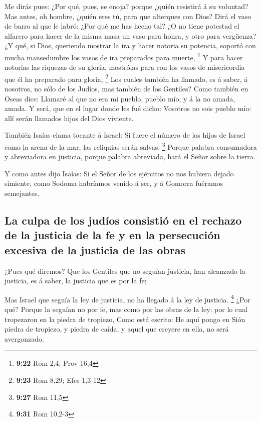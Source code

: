  Me dirás pues: ¿Por qué, pues, se enoja? porque ¿quién
resistirá á su voluntad?  Mas antes, oh hombre, ¿quién
eres tú, para que alterques con Dios? Dirá el vaso de barro al que le
labró: ¿Por qué me has hecho tal?  ¿O no tiene potestad
el alfarero para hacer de la misma masa un vaso para honra, y otro para
vergüenza?  ¿Y qué, si Dios, queriendo mostrar la ira y
hacer notoria su potencia, soportó con mucha mansedumbre los vasos de
ira preparados para muerte, \footnote{\textbf{9:22} Rom 2,4; Prov 16,4}
 Y para hacer notorias las riquezas de su gloria,
mostrólas para con los vasos de misericordia que él ha preparado para
gloria; \footnote{\textbf{9:23} Rom 8,29; Efes 1,3-12} 
Los cuales también ha llamado, es á saber, á nosotros, no sólo de los
Judíos, mas también de los Gentiles?  Como también en
Oseas dice: Llamaré al que no era mi pueblo, pueblo mío; y á la no
amada, amada.  Y será, que en el lugar donde les fué
dicho: Vosotros no sois pueblo mío: allí serán llamados hijos del Dios
viviente.

 También Isaías clama tocante á Israel: Si fuere el
número de los hijos de Israel como la arena de la mar, las reliquias
serán salvas: \footnote{\textbf{9:27} Rom 11,5}  Porque
palabra consumadora y abreviadora en justicia, porque palabra abreviada,
hará el Señor sobre la tierra.

 Y como antes dijo Isaías: Si el Señor de los ejércitos
no nos hubiera dejado simiente, como Sodoma habríamos venido á ser, y á
Gomorra fuéramos semejantes.

\hypertarget{la-culpa-de-los-juduxedos-consistiuxf3-en-el-rechazo-de-la-justicia-de-la-fe-y-en-la-persecuciuxf3n-excesiva-de-la-justicia-de-las-obras}{%
\subsection{La culpa de los judíos consistió en el rechazo de la
justicia de la fe y en la persecución excesiva de la justicia de las
obras}\label{la-culpa-de-los-juduxedos-consistiuxf3-en-el-rechazo-de-la-justicia-de-la-fe-y-en-la-persecuciuxf3n-excesiva-de-la-justicia-de-las-obras}}

 ¿Pues qué diremos? Que los Gentiles que no seguían
justicia, han alcanzado la justicia, es á saber, la justicia que es por
la fe;

 Mas Israel que seguía la ley de justicia, no ha llegado
á la ley de justicia. \footnote{\textbf{9:31} Rom 10,2-3}
 ¿Por qué? Porque la seguían no por fe, mas como por las
obras de la ley: por lo cual tropezaron en la piedra de tropiezo,
 Como está escrito: He aquí pongo en Sión piedra de
tropiezo, y piedra de caída; y aquel que creyere en ella, no será
avergonzado.

